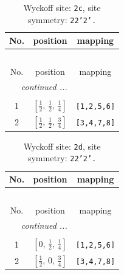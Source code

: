 \documentclass[fleqn,8pt]{jsarticle}
\begin{document}
\renewcommand{\arraystretch}{1.2}
\begin{longtable}{ccc}
\caption{Wyckoff site: {\tt 2c}, site symmetry: {\tt 22'2'.}}
 \\
 \hline \hline
No. & position & mapping \\ \hline \endfirsthead

\multicolumn{2}{l}{\tablename\ \thetable{}} \\
 \hline \hline
No. & position & mapping \\ \hline \endhead

 \hline \hline
\multicolumn{2}{r}{\footnotesize\it continued ...} \\ \endfoot

 \hline \hline
\multicolumn{2}{r}{} \\ \endlastfoot

1 & $\left[ \frac{1}{2},\, \frac{1}{2},\, \frac{1}{4} \right]$ & {\tt [1,2,5,6]} \\ \hline
2 & $\left[ \frac{1}{2},\, \frac{1}{2},\, \frac{3}{4} \right]$ & {\tt [3,4,7,8]} \\
\end{longtable}
\renewcommand{\arraystretch}{1.2}
\begin{longtable}{ccc}
\caption{Wyckoff site: {\tt 2d}, site symmetry: {\tt 22'2'.}}
 \\
 \hline \hline
No. & position & mapping \\ \hline \endfirsthead

\multicolumn{2}{l}{\tablename\ \thetable{}} \\
 \hline \hline
No. & position & mapping \\ \hline \endhead

 \hline \hline
\multicolumn{2}{r}{\footnotesize\it continued ...} \\ \endfoot

 \hline \hline
\multicolumn{2}{r}{} \\ \endlastfoot

1 & $\left[ 0,\, \frac{1}{2},\, \frac{1}{4} \right]$ & {\tt [1,2,5,6]} \\ \hline
2 & $\left[ \frac{1}{2},\, 0,\, \frac{3}{4} \right]$ & {\tt [3,4,7,8]} \\
\end{longtable}
\renewcommand{\arraystretch}{1.2}
\end{document}
